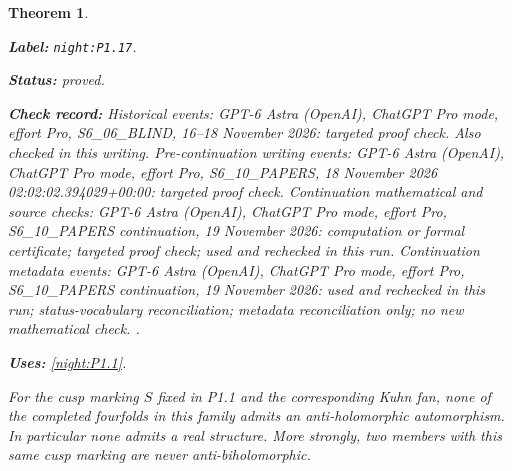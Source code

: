\documentclass[11pt,a4paper]{article}
\newtheorem{theorem}{Theorem}[section]
\theoremstyle{definition}
\newcommand{\StatementRecord}[4]{\par\smallskip\begingroup\upshape\raggedright\noindent\textbf{Label:} \nolinkurl{#1}.\par\noindent\textbf{Status:} #2.\par\noindent\textbf{Check record:} #3.\par\noindent\textbf{Uses:} #4.\par\endgroup\smallskip}
\begin{document}
\begin{theorem}\label{night:P1.17}
\StatementRecord{night:P1.17}{proved}{Historical events: GPT-6 Astra (OpenAI), ChatGPT Pro mode, effort Pro, S6\_06\_BLIND, 16--18 November 2026: targeted proof check. Also checked in this writing. Pre-continuation writing events: GPT-6 Astra (OpenAI), ChatGPT Pro mode, effort Pro, S6\_10\_PAPERS, 18 November 2026 02:02:02.394029+00:00: targeted proof check. Continuation mathematical and source checks: GPT-6 Astra (OpenAI), ChatGPT Pro mode, effort Pro, S6\_10\_PAPERS continuation, 19 November 2026: computation or formal certificate; targeted proof check; used and rechecked in this run. Continuation metadata events: GPT-6 Astra (OpenAI), ChatGPT Pro mode, effort Pro, S6\_10\_PAPERS continuation, 19 November 2026: used and rechecked in this run; status-vocabulary reconciliation; metadata reconciliation only; no new mathematical check. }{\cref{night:P1.1}}
For the cusp marking $S$ fixed in P1.1 and the corresponding Kuhn fan,
none of the completed fourfolds in this family admits an
anti-holomorphic automorphism.  In particular none admits a real
structure.  More strongly, two members with this same cusp marking
are never anti-biholomorphic.
\end{theorem}
\end{document}
